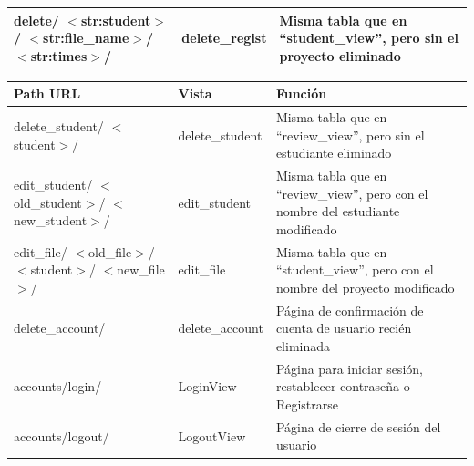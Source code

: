 \documentclass[a4paper, 12pt]{book}
\begin{document}
\begin{table}[H]
\begin{center}
\begin{tabular}{ | m{3.1cm} | m{3.3cm} | m{8.8cm} | }
        delete/ \newline $<$str:student$>$/ \newline $<$str:file\_name$>$/ \newline $<$str:times$>$/ & 
        delete\_regist &
        Misma tabla que en ``student\_view'', pero sin el proyecto eliminado \\ \hline
    
      \end{tabular}
     \end{center}
    \end{table}
    
    \begin{table}[H]
     \begin{center}
      \begin{tabular}{ | m{3.1cm} | m{3.3cm} | m{8.8cm} | }
        \hline \textbf{Path URL} & \textbf{Vista} & \textbf{Función}\\ \hline
    
        delete\_student/ \newline $<$student$>$/ & 
        delete\_student & 
        Misma tabla que en ``review\_view'', pero sin el estudiante eliminado \\ \hline  
        
        edit\_student/ \newline $<$old\_student$>$/ \newline $<$new\_student$>$/ &
        edit\_student &
        Misma tabla que en ``review\_view'', pero con el nombre del estudiante modificado \\ \hline  
        
        edit\_file/ \newline $<$old\_file$>$/ \newline $<$student$>$/ \newline $<$new\_file$>$/ &
        edit\_file &
        Misma tabla que en ``student\_view'', pero con el nombre del proyecto modificado \\ \hline  
        
        delete\_account/ &
        delete\_account &
        Página de confirmación de cuenta de usuario recién eliminada \\ \hline  
        
        accounts/login/ &
        LoginView &
        Página para iniciar sesión, restablecer contraseña o Registrarse \\ \hline  
        
        accounts/logout/ &
        LogoutView &
        Página de cierre de sesión del usuario \\ \hline  
        

\end{tabular}
\end{center}
\end{table}
\end{document}
